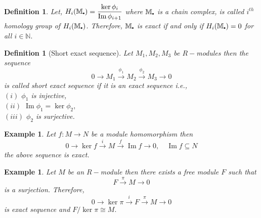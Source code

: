 \documentclass[11pt]{amsart}
\newtheorem{defn}[theorem]{Definition}
\newtheorem{eg}[theorem]{Example}
\newcommand{\NN}{\mathbb N}
\newcommand\sbullet[1][.5]{\mathbin{\vcenter{\hbox{\scalebox{#1}{$\bullet$}}}}}
\begin{document}
\begin{defn}

Let, $H_i(\mathbb{M}_{\sbullet})=\dfrac{\operatorname{ker}\phi_{i}}{\operatorname{Im}\phi_{i+1}}$ where $\mathbb{M}_{\sbullet}$ is a chain complex, is called $i^{th}$ homology group of $H_i(\mathbb{M}_{\sbullet})$. Therefore, $\mathbb{M}_{\sbullet} $ is exact if and only if $H_i(\mathbb{M}_{\sbullet})=0$ for all $i\in{\NN}.$

\end{defn}

\begin{defn}[Short exact sequence]

Let $M_1,M_2,M_3$ be $R-$modules then the sequence $$0\longrightarrow M_1\stackrel{\phi_1}{\longrightarrow} M_2\stackrel{\phi_2}{\longrightarrow} M_3\longrightarrow 0$$ is called short exact sequence if it is an exact sequence i.e., \\$(i)$ $\phi_1$ is injective,\\
$(ii)$ $\operatorname{Im}\phi_1=\operatorname{ker}\phi_2,$\\
$(iii)$ $\phi_2$ is surjective.

\end{defn}

\begin{eg}

Let $f:M\to N$ be a module homomorphism then $$0\longrightarrow \operatorname{ker}f\stackrel{i}{\longrightarrow}M\stackrel{f}{\longrightarrow}\operatorname{Im}f\longrightarrow 0, \quad\operatorname{Im}f\subseteq N$$
the above sequence is exact.

\end{eg}

\begin{eg}

Let $M$ be an $R-$module then there exists a free module $F$ such that $$F\stackrel{\pi}{\longrightarrow} M\longrightarrow 0$$ is a surjection. Therefore, $$0\longrightarrow \operatorname{ker}\pi\stackrel{i}{\longrightarrow}  F\stackrel{\pi}{\longrightarrow} M\longrightarrow 0$$ is exact sequence and $F/\operatorname{ker}\pi\cong M.$

\end{eg}
\end{document}

